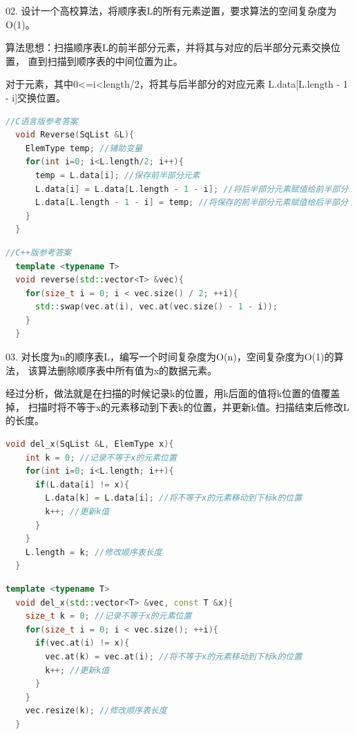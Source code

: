 \documentclass[b5paper,11pt]{article}
\begin{document}
\begin{question}
02. 设计一个高校算法，将顺序表L的所有元素逆置，要求算法的空间复杂度为O(1)。
\end{question}
\begin{solution}
算法思想：扫描顺序表L的前半部分元素，并将其与对应的后半部分元素交换位置，
直到扫描到顺序表的中间位置为止。

\vspace{0.3em}

对于元素，其中0<=i<length/2，将其与后半部分的对应元素
L.data[L.length - 1 - i]交换位置。

\begin{lstlisting}[language=C++]
  //C语言版参考答案
  void Reverse(SqList &L){
    ElemType temp; //辅助变量
    for(int i=0; i<L.length/2; i++){
      temp = L.data[i]; //保存前半部分元素
      L.data[i] = L.data[L.length - 1 - i]; //将后半部分元素赋值给前半部分
      L.data[L.length - 1 - i] = temp; //将保存的前半部分元素赋值给后半部分
    }
  }
\end{lstlisting}

\begin{lstlisting}[language=C++]
  //C++版参考答案
  template <typename T>
  void reverse(std::vector<T> &vec){
    for(size_t i = 0; i < vec.size() / 2; ++i){
      std::swap(vec.at(i), vec.at(vec.size() - 1 - i));
    }
  }
\end{lstlisting}
\end{solution}

\psplit

\begin{question}
03. 对长度为n的顺序表L，编写一个时间复杂度为O(n)，空间复杂度为O(1)的算法，
该算法删除顺序表中所有值为x的数据元素。
\end{question}

\begin{solution}
经过分析，做法就是在扫描的时候记录k的位置，用k后面的值将k位置的值覆盖掉，
扫描时将不等于x的元素移动到下表k的位置，并更新k值。扫描结束后修改L的长度。

\begin{lstlisting}[language=C]
  void del_x(SqList &L, ElemType x){
    int k = 0; //记录不等于x的元素位置
    for(int i=0; i<L.length; i++){
      if(L.data[i] != x){
        L.data[k] = L.data[i]; //将不等于x的元素移动到下标k的位置
        k++; //更新k值
      }
    }
    L.length = k; //修改顺序表长度
  }
\end{lstlisting}

\begin{lstlisting}[language=C++]
  template <typename T>
  void del_x(std::vector<T> &vec, const T &x){
    size_t k = 0; //记录不等于x的元素位置
    for(size_t i = 0; i < vec.size(); ++i){
      if(vec.at(i) != x){
        vec.at(k) = vec.at(i); //将不等于x的元素移动到下标k的位置
        k++; //更新k值
      }
    }
    vec.resize(k); //修改顺序表长度
  }
\end{lstlisting}
\end{solution}
\end{document}
